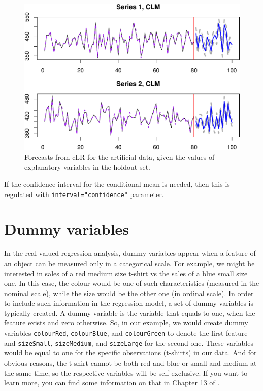 \documentclass[
]{book}
\begin{document}
\begin{figure}
\centering
\includegraphics{Svetunkov---Svetunkov---Complex-Valued-Econometrics_files/figure-latex/CLRArtificialForecast-1.pdf}
\caption{\label{fig:CLRArtificialForecast}Forecasts from cLR for the artificial data, given the values of explanatory variables in the holdout set.}
\end{figure}

If the confidence interval for the conditional mean is needed, then this is regulated with \texttt{interval="confidence"} parameter.

\hypertarget{multipleCLRDummy}{%
\section{Dummy variables}\label{multipleCLRDummy}}

In the real-valued regression analysis, dummy variables appear when a feature of an object can be measured only in a categorical scale. For example, we might be interested in sales of a red medium size t-shirt vs the sales of a blue small size one. In this case, the colour would be one of such characteristics (measured in the nominal scale), while the size would be the other one (in ordinal scale). In order to include such information in the regression model, a set of dummy variables is typically created. A dummy variable is the variable that equals to one, when the feature exists and zero otherwise. So, in our example, we would create dummy variables \texttt{colourRed}, \texttt{colourBlue}, and \texttt{colourGreen} to denote the first feature and \texttt{sizeSmall}, \texttt{sizeMedium}, and \texttt{sizeLarge} for the second one. These variables would be equal to one for the specific observations (t-shirts) in our data. And for obvious reasons, the t-shirt cannot be both red and blue or small and medium at the same time, so the respective variables will be self-exclusive. If you want to learn more, you can find some information on that in Chapter 13 of \citet{SvetunkovSBA}.
\end{document}
